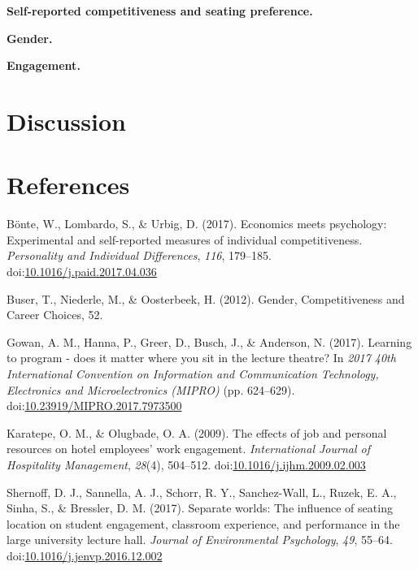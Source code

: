 \documentclass[man]{apa6}
\begin{document}
\textbf{Self-reported competitiveness and seating preference.}

\textbf{Gender.}

\textbf{Engagement.}

\hypertarget{discussion}{%
\section{Discussion}\label{discussion}}

\newpage

\hypertarget{references}{%
\section{References}\label{references}}

\begingroup
\setlength{\parindent}{-0.5in}
\setlength{\leftskip}{0.5in}

\hypertarget{refs}{}
\leavevmode\hypertarget{ref-bonte_economics_2017}{}%
Bönte, W., Lombardo, S., \& Urbig, D. (2017). Economics meets psychology: Experimental and self-reported measures of individual competitiveness. \emph{Personality and Individual Differences}, \emph{116}, 179--185. doi:\href{https://doi.org/10.1016/j.paid.2017.04.036}{10.1016/j.paid.2017.04.036}

\leavevmode\hypertarget{ref-buser_gender_2012}{}%
Buser, T., Niederle, M., \& Oosterbeek, H. (2012). Gender, Competitiveness and Career Choices, 52.

\leavevmode\hypertarget{ref-gowan_learning_2017}{}%
Gowan, A. M., Hanna, P., Greer, D., Busch, J., \& Anderson, N. (2017). Learning to program - does it matter where you sit in the lecture theatre? In \emph{2017 40th International Convention on Information and Communication Technology, Electronics and Microelectronics (MIPRO)} (pp. 624--629). doi:\href{https://doi.org/10.23919/MIPRO.2017.7973500}{10.23919/MIPRO.2017.7973500}

\leavevmode\hypertarget{ref-karatepe_effects_2009}{}%
Karatepe, O. M., \& Olugbade, O. A. (2009). The effects of job and personal resources on hotel employees' work engagement. \emph{International Journal of Hospitality Management}, \emph{28}(4), 504--512. doi:\href{https://doi.org/10.1016/j.ijhm.2009.02.003}{10.1016/j.ijhm.2009.02.003}

\leavevmode\hypertarget{ref-shernoff_separate_2017}{}%
Shernoff, D. J., Sannella, A. J., Schorr, R. Y., Sanchez-Wall, L., Ruzek, E. A., Sinha, S., \& Bressler, D. M. (2017). Separate worlds: The influence of seating location on student engagement, classroom experience, and performance in the large university lecture hall. \emph{Journal of Environmental Psychology}, \emph{49}, 55--64. doi:\href{https://doi.org/10.1016/j.jenvp.2016.12.002}{10.1016/j.jenvp.2016.12.002}

\endgroup
\end{document}
